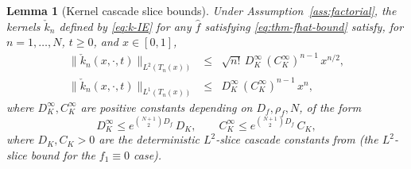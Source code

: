 \documentclass[journal,twoside,web]{ieeecolor}
\newtheorem{lemma}{Lemma}
\begin{document}
\begin{lemma}[Kernel cascade slice bounds]\label{lem:k-bounds}
Under Assumption~\ref{ass:factorial}, the kernels $\check k_n$ defined by \eqref{eq:k-IE} for any $\hat f$ satisfying \eqref{eq:thm-fhat-bound} satisfy, for $n=1,\ldots,N$, $t\ge 0$, and $x\in[0,1]$,
\begin{eqnarray}
\|\check k_n(x,\cdot,t)\|_{L^2(T_n(x))} &\le& \sqrt{n!}\,D_K^\infty\,(C_K^\infty)^{n-1}\,x^{n/2}, \label{eq:k-L2-explicit}\\
\|\check k_n(x,\cdot,t)\|_{L^1(T_n(x))} &\le& D_K^\infty\,(C_K^\infty)^{n-1}\,x^n, \label{eq:k-L1-explicit}
\end{eqnarray}
where $D_K^\infty,C_K^\infty$ are positive constants depending on $D_f,\rho_f,N$, of the form
\begin{equation}\label{eq:DK-CK-infty}
D_K^\infty\le e^{\binom{N+1}{2}D_f}\,D_K,\qquad C_K^\infty\le e^{\binom{N+1}{2}D_f}\,C_K,
\end{equation}
where $D_K,C_K>0$ are the deterministic $L^2$-slice cascade constants from \cite[Theorem~1]{HV1} (the $L^2$-slice bound for the $f_1\equiv 0$ case).
\end{lemma}
\end{document}
